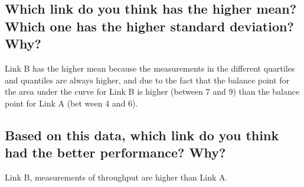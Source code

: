 \documentclass [12 pt , a4paper ] {article}
\begin{document}
 \subsection{Which link do you think has the higher mean? Which one has the higher standard deviation? Why?}
 \par Link B has the higher mean because the measurements in the
 different quartiles and quantiles
 are always higher, and due to the fact that the balance point for the area
 under the curve for Link B is higher (between 7 and 9) than the balance point for Link A (bet
 ween 4 and 6).
 \subsection{Based on this data, which link do you think had the better performance? Why?}
 \par Link B, measurements of throughput are higher than Link A.
\end{document}
